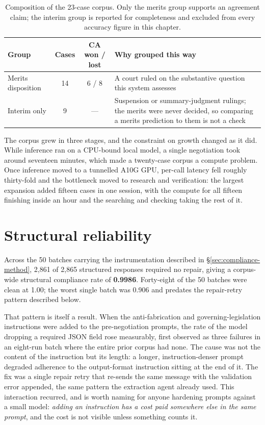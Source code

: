 \begin{table}[htbp]
\centering
\footnotesize
\caption[Corpus composition]{Composition of the 23-case corpus. Only the merits
group supports an agreement claim; the interim group is reported for completeness
and excluded from every accuracy figure in this chapter.}
\label{tab:corpus-summary}
\begin{tabular}{@{}lccp{5.6cm}@{}}
\toprule
\textbf{Group} & \textbf{Cases} & \textbf{CA won / lost} & \textbf{Why grouped this way} \\
\midrule
Merits disposition & 14 & 6 / 8 &
  A court ruled on the substantive question this system assesses \\
Interim only & 9 & --- &
  Suspension or summary-judgment rulings; the merits were never decided, so
  comparing a merits prediction to them is not a check \\
\bottomrule
\end{tabular}
\end{table}

The corpus grew in three stages, and the constraint on growth changed as it did.
While inference ran on a CPU-bound local model, a single negotiation took around
seventeen minutes, which made a twenty-case corpus a compute problem. Once
inference moved to a tunnelled A10G GPU, per-call latency fell roughly thirty-fold
and the bottleneck moved to research and verification: the largest expansion added
fifteen cases in one session, with the compute for all fifteen finishing inside an
hour and the searching and checking taking the rest of it.

\section{Structural reliability}
\label{sec:structural}

Across the 50 batches carrying the instrumentation described in
\S\ref{sec:compliance-method}, 2{,}861 of 2{,}865
structured responses required no repair, giving a corpus-wide structural
compliance rate of \textbf{0.9986}. Forty-eight of the 50 batches were clean at
1.00; the worst single batch was 0.906 and predates the repair-retry pattern
described below.

That pattern is itself a result. When the anti-fabrication and
governing-legislation instructions were added to the pre-negotiation prompts, the
rate of the model dropping a required JSON field rose measurably, first observed as
three failures in an eight-run batch where the entire prior corpus had none. The
cause was not the content of the instruction but its length: a longer,
instruction-denser prompt degraded adherence to the output-format instruction
sitting at the end of it. The fix was a single repair retry that re-sends the same
message with the validation error appended, the same pattern the extraction agent
already used. This interaction recurred, and is worth naming for anyone hardening
prompts against a small model: \emph{adding an instruction has a cost paid
somewhere else in the same prompt}, and the cost is not visible unless something
counts it.

